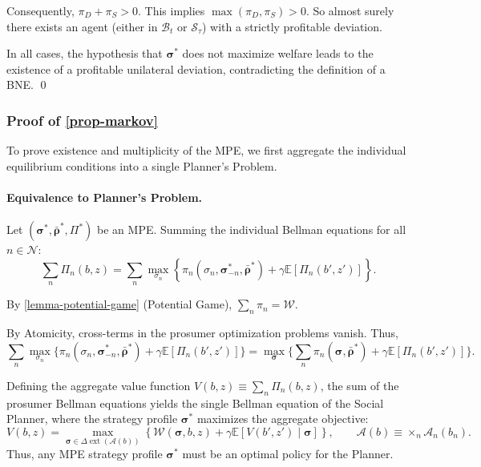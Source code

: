 \documentclass[12pt, notitlepage]{article}
\begin{document}
    
    Consequently,  $\pi_D + \pi_S > 0$. This implies $\max(\pi_D, \pi_S) > 0$. So  almost surely there exists an agent (either in $\mathcal{B}_t$ or $\mathcal{S}_\tau$) with a strictly profitable deviation.


In all cases, the hypothesis that $\boldsymbol{\sigma}^*$ does not maximize welfare leads to the existence of a profitable unilateral deviation, contradicting the definition of a BNE. \qed


\subsubsection*{Proof of \cref{prop-markov}}

To prove existence and multiplicity of the MPE, we first aggregate the individual equilibrium conditions into a single Planner's Problem.

\paragraph{Equivalence to Planner's Problem.}
Let $(\boldsymbol{\sigma}^*, \bar{\boldsymbol{\rho}}^*, \Pi^*)$ be an MPE. Summing the individual Bellman equations for all $n \in \mathcal{N}$:
\[
    \sum_{n} \Pi_n(b, z) = \sum_{n} \max_{\sigma_n} \left\{ \pi_n(\sigma_n, \boldsymbol{\sigma}^*_{-n}, \bar{\boldsymbol{\rho}}^*) + \gamma \mathbb{E}[\Pi_n(b', z')] \right\}.
\]

By \cref{lemma-potential-game} (Potential Game), $\sum_n \pi_n = \mathcal{W}$.

By Atomicity, cross-terms in the prosumer optimization problems vanish. Thus,$$ \sum_{n} \max_{\sigma_n} \Big\{ \pi_n(\sigma_n, \boldsymbol{\sigma}^*_{-n}, \bar{\boldsymbol{\rho}}^*) + \gamma \mathbb{E}[\Pi_n(b', z')] \Big\} 
= 
\max_{\boldsymbol{\sigma}} \Big\{ \sum_{n} \pi_n(\boldsymbol{\sigma}, \bar{\boldsymbol{\rho}}^*) + \gamma \mathbb{E}[\Pi_n(b', z')] \Big\}.$$


Defining the aggregate value function $V(b, z) \equiv \sum_{n} \Pi_n(b, z)$, the sum of the prosumer Bellman equations yields the single Bellman equation of the Social Planner, where the strategy profile $\boldsymbol{\sigma}^*$ maximizes the aggregate objective:
\begin{equation} \label{eq:planner_bellman}
    V(b, z) = \max_{\boldsymbol{\sigma} \in \Delta\operatorname{ext}(\mathcal{A}(b))} \left\{ \mathcal{W}(\boldsymbol{\sigma}, b, z) + \gamma \mathbb{E}[V(b', z') \mid \boldsymbol{\sigma}] \right\}, \qquad  \mathcal{A}(b) \equiv \times_n \mathcal{A}_n(b_n).
\end{equation}
Thus, any MPE strategy profile $\boldsymbol{\sigma}^*$ must be an optimal policy for the Planner.
\end{document}
